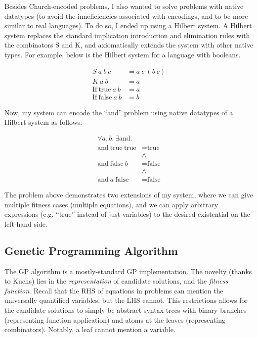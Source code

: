 \documentclass{article}
\newcommand{\n}[1]{\textrm{#1}}
\begin{document}
Besides Church-encoded problems, I also wanted to solve problems with
native datatypes (to avoid the inneficiencies associated with
encodings, and to be more similar to real languages).
To do so, I ended up using a Hilbert system. A Hilbert system replaces
the standard implication introduction and elimination rules with the
combinators S and K, and axiomatically extends the system with other
native types. For example, below is the Hilbert system for a language
with booleans.

\begin{align*}
S ~ a ~ b ~ c &= a ~ c ~ (b ~ c)\\
K ~ a ~ b &= a\\
\n{If} ~ \n{true} ~ a ~ b &= a\\
\n{If} ~ \n{false} ~ a ~ b &= b
\end{align*}

Now, my system can encode the ``and'' problem using native datatypes of a
Hilbert system as follows.

\begin{align*}
\forall a,b . ~ \exists \n{and} .\\
\n{and} ~ \n{true} ~ \n{true} &= \n{true}\\
&\land\\
\n{and} ~ \n{false} ~ b &= \n{false}\\
&\land\\
\n{and} ~ a ~ \n{false} &= \n{false}
\end{align*}

The problem above demonstrates two extensions of my system, where we
can give multiple fitness cases (multiple equations), and we can apply
arbitrary expressions (e.g. ``true'' instead of just variables) to the
desired existential on the left-hand side.

\subsection{Genetic Programming Algorithm}

The GP algorithm is a mostly-standard GP implementation. The novelty
(thanks to Kuchs) lies in the \textit{representation} of candidate
solutions, and the \textit{fitness function}. Recall that the RHS of
equations in problems can mention the universally quantified
variables, but the LHS cannot. This restrictions allows for the
candidate solutions to simply be abstract syntax trees with binary
branches (representing function application) and atoms at the leaves
(representing combinators). Notably, a leaf cannot mention a variable.
\end{document}
